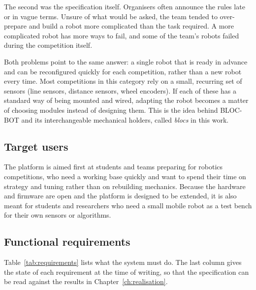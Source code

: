 The second was the specification itself. Organisers often announce the rules late or in
vague terms. Unsure of what would be asked, the team tended to over-prepare and build a
robot more complicated than the task required. A more complicated robot has more ways to
fail, and some of the team's robots failed during the competition itself.

Both problems point to the same answer: a single robot that is ready in advance and can
be reconfigured quickly for each competition, rather than a new robot every time. Most
competitions in this category rely on a small, recurring set of sensors (line sensors,
distance sensors, wheel encoders). If each of these has a standard way of being mounted
and wired, adapting the robot becomes a matter of choosing modules instead of designing
them. This is the idea behind BLOC-BOT and its interchangeable mechanical holders, called
\emph{blocs} in this work.

\subsection{Target users}
The platform is aimed first at students and teams preparing for robotics competitions,
who need a working base quickly and want to spend their time on strategy and tuning rather
than on rebuilding mechanics. Because the hardware and firmware are open and the
platform is designed to be extended, it is also meant for students and researchers who
need a small mobile robot as a test bench for their own sensors or algorithms.

\subsection{Functional requirements}
Table~\ref{tab:requirements} lists what the system must do. The last column gives the
state of each requirement at the time of writing, so that the specification can be read
against the results in Chapter~\ref{ch:realisation}.

